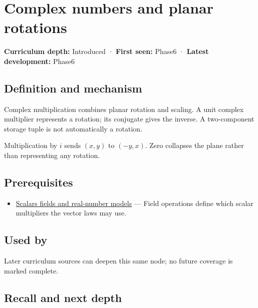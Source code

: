 \hypertarget{appendix-f77eadcc4a93}{}\label{referencestart:appendix-f77eadcc4a93}
\section{Complex numbers and planar rotations}\label{appendix-f77eadcc4a93-complex-numbers-and-planar-rotations}

\textbf{Curriculum depth:} Introduced · \textbf{First seen:} Phase6 · \textbf{Latest development:} Phase6

\begin{allmightroledefinition}

\subsection{Definition and mechanism}\label{appendix-f77eadcc4a93-definition-and-mechanism}

Complex multiplication combines planar rotation and scaling. A unit complex multiplier represents a rotation; its conjugate gives the inverse. A two-component storage tuple is not automatically a rotation.

\end{allmightroledefinition}

Multiplication by \(i\) sends \((x,y)\) to \((-y,x)\). Zero collapses the plane rather than representing any rotation.

\subsection{Prerequisites}\label{appendix-f77eadcc4a93-prerequisites}

\begin{itemize}
\tightlist
\item
  \hyperref[appendix-52051ad550fe]{Scalars fields and real-number models} --- Field operations define which scalar multipliers the vector laws may use.
\end{itemize}

\subsection{Used by}\label{appendix-f77eadcc4a93-used-by}

Later curriculum sources can deepen this same node; no future coverage is marked complete.

\subsection{Recall and next depth}\label{appendix-f77eadcc4a93-recall-and-next-depth}

